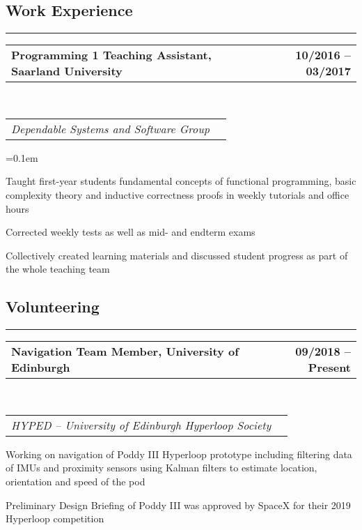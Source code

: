 \documentclass[10pt,letterpaper]{article}
\makeatletter
\newcommand{\headerrow}[2]
{\begin{tabular*}{\linewidth}{l@{\extracolsep{\fill}}r}
	#1 &
	#2 \\
\end{tabular*}}
\makeatother
\begin{document}
\subsection*{Work Experience}
\hrule
\vspace{0.4em}

\noindent
\headerrow{\textbf{Programming 1 Teaching Assistant, Saarland University}}{\textbf{10/2016 -- 03/2017}}
\\
\headerrow{\emph{Dependable Systems and Software Group}}{}
\vspace{-1.6em}
\begin{itemize*}
    \parskip=0.1em
    \item Taught first-year students fundamental concepts of functional programming, basic complexity theory and inductive correctness proofs in weekly tutorials and office hours
    \item Corrected weekly tests as well as mid- and endterm exams
    \item Collectively created learning materials and discussed student progress as part of the whole teaching team
\end{itemize*}


\subsection*{Volunteering}
\hrule
\vspace{0.4em}

\noindent
\headerrow{\textbf{Navigation Team Member, University of Edinburgh}}{\textbf{09/2018 -- Present}}
\\
\headerrow{\emph{HYPED -- University of Edinburgh Hyperloop Society}}{}
\vspace{-1.6em}
\begin{itemize*}
    \item Working on navigation of Poddy III Hyperloop prototype including filtering data of IMUs and proximity sensors 
    using Kalman filters to estimate location, orientation and speed of the pod
    \item Preliminary Design Briefing of Poddy III was approved by SpaceX for their 2019 Hyperloop competition
\end{itemize*}

\vspace{0.4em}
\end{document}
